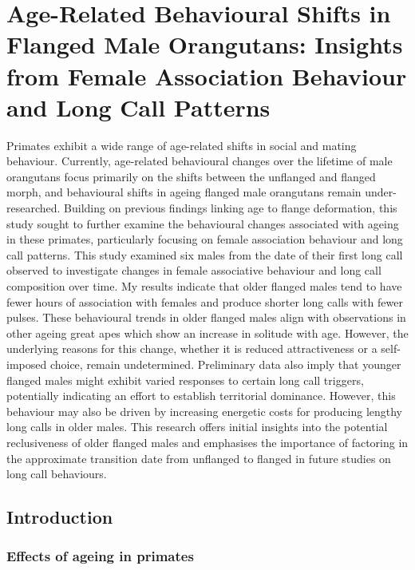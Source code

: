 \chapter{Age-Related Behavioural Shifts in Flanged Male Orangutans: Insights from Female Association Behaviour and Long Call Patterns}

Primates exhibit a wide range of age-related shifts in social and mating behaviour. Currently, age-related behavioural changes over the lifetime of male orangutans focus primarily on the shifts between the unflanged and flanged morph, and behavioural shifts in ageing flanged male orangutans remain under-researched. Building on previous findings linking age to flange deformation, this study sought to further examine the behavioural changes associated with ageing in these primates, particularly focusing on female association behaviour and long call patterns. This study examined six males from the date of their first long call observed to investigate changes in female associative behaviour and long call composition over time. My results indicate that older flanged males tend to have fewer hours of association with females and produce shorter long calls with fewer pulses. These behavioural trends in older flanged males align with observations in other ageing great apes which show an increase in solitude with age. However, the underlying reasons for this change, whether it is reduced attractiveness or a self-imposed choice, remain undetermined. Preliminary data also imply that younger flanged males might exhibit varied responses to certain long call triggers, potentially indicating an effort to establish territorial dominance. However, this behaviour may also be driven by increasing energetic costs for producing lengthy long calls in older males. This research offers initial insights into the potential reclusiveness of older flanged males and emphasises the importance of factoring in the approximate transition date from unflanged to flanged in future studies on long call behaviours.
   
\section{Introduction}

\subsection{Effects of ageing in primates}

